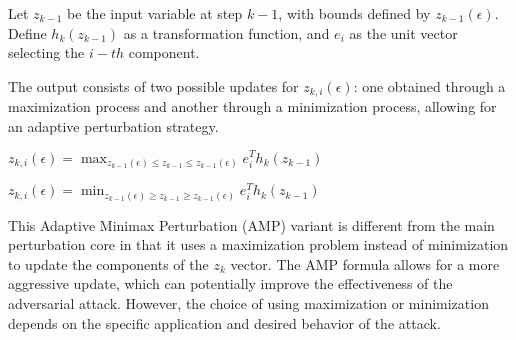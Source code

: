 Let  $z_{k-1}$ be the input variable at step $k-1$, with bounds defined by $z_{k-1}(\epsilon)$. 
Define $h_k(z_{k-1})$ as a transformation function, and $e_i$ as the unit vector selecting the $i-th$ component.

The output consists of two possible updates for $z_{k,i}(\epsilon)$: 
one obtained through a maximization process and another through a minimization process, allowing for an adaptive perturbation strategy.


$z_{k,i}(\epsilon) = \max_{z_{k-1}(\epsilon) \leq z_{k-1} \leq z_{k-1}(\epsilon)} e^T_i h_k(z_{k-1})$

$z_{k,i}(\epsilon) = \min_{z_{k-1}(\epsilon) \geq z_{k-1} \geq z_{k-1}(\epsilon)} e^T_i h_k(z_{k-1})$

This Adaptive Minimax Perturbation (AMP) variant is different from the main perturbation core in that it uses a maximization problem instead of minimization to update the components of the $z_k$ vector. The AMP formula allows for a more aggressive update, which can potentially improve the effectiveness of the adversarial attack. However, the choice of using maximization or minimization depends on the specific application and desired behavior of the attack.